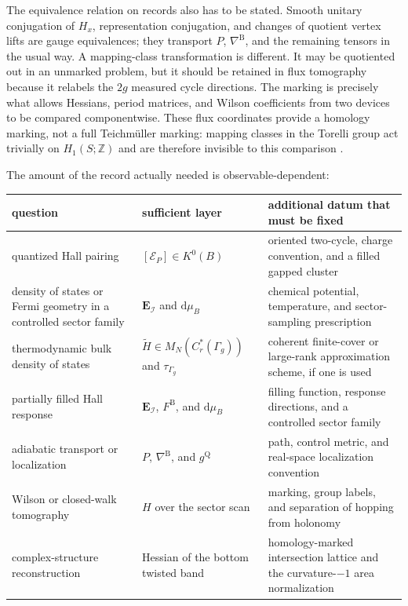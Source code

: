 \documentclass[11pt]{article}
\theoremstyle{definition}
\theoremstyle{remark}
\newcommand{\ZZ}{\mathbb Z}
\newcommand{\dd}{\mathrm d}
\begin{document}
The equivalence relation on records also has to be stated.  Smooth unitary
conjugation of \(H_x\), representation conjugation, and changes of quotient
vertex lifts are gauge equivalences; they transport \(P\),
\(\nabla^{\mathrm B}\), and the remaining tensors in the usual way.  A
mapping-class transformation is different.  It may be quotiented out in an
unmarked problem, but it should be retained in flux tomography because it
relabels the \(2g\) measured cycle directions.  The marking is precisely what
allows Hessians, period matrices, and Wilson coefficients from two devices
to be compared componentwise.  These flux coordinates provide a homology
marking, not a full Teichm\"uller marking: mapping classes in the Torelli
group act trivially on \(H_1(S;\ZZ)\) and are therefore invisible to this
comparison \cite{FarbMargalit}.

The amount of the record actually needed is observable-dependent:
\begingroup
\renewcommand{\arraystretch}{1.12}
\begin{center}
\small
\begin{tabular}{@{}
 >{\raggedright\arraybackslash}p{}
 >{\raggedright\arraybackslash}p{}
 >{\raggedright\arraybackslash}p{}@{}}
\toprule
\textbf{question} & \textbf{sufficient layer} & \textbf{additional datum that must be fixed}\\
\midrule
quantized Hall pairing
 & \([\mathscr E_P]\in K^0(B)\)
 & oriented two-cycle, charge convention, and a filled gapped cluster\\
density of states or Fermi geometry in a controlled sector family
 & \(\boldsymbol E_{\mathcal I}\) and \(\dd\mu_B\)
 & chemical potential, temperature, and sector-sampling prescription\\
thermodynamic bulk density of states
 & \(\widetilde H\in M_N(C_r^*(\Gamma_g))\) and
   \(\tau_{\Gamma_g}\)
 & coherent finite-cover or large-rank approximation scheme, if one is used\\
partially filled Hall response
 & \(\boldsymbol E_{\mathcal I}\), \(F^{\mathrm B}\), and
   \(\dd\mu_B\)
 & filling function, response directions, and a controlled sector family\\
adiabatic transport or localization
 & \(P\), \(\nabla^{\mathrm B}\), and \(g^{\mathrm Q}\)
 & path, control metric, and real-space localization convention\\
Wilson or closed-walk tomography
 & \(H\) over the sector scan
 & marking, group labels, and separation of hopping from holonomy\\
complex-structure reconstruction
 & Hessian of the bottom twisted band
 & homology-marked intersection lattice and the curvature-\(-1\) area normalization\\
\bottomrule
\end{tabular}
\end{center}
\endgroup
\end{document}
